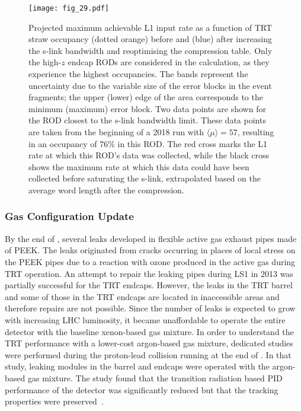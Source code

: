 \documentclass[cernpreprint, atlasdraft=false, UKenglish,british,orcidlogo, texmf, orcidlogo]{atlasdoc}
\begin{document}
 
\begin{figure}[htbp]
\centering
\texttt{[image: fig\_29.pdf]}
\caption{
Projected maximum achievable \gls{L1} input rate as a function of \gls{TRT} straw occupancy (dotted orange) before and (blue) after increasing the \gls{s-link} bandwidth and reoptimising the compression table.
Only the high-$z$ endcap \glspl{ROD} are considered in the calculation, as they experience the highest occupancies.
The bands represent the uncertainty due to the variable size of the error blocks in the event fragments; the upper (lower) edge of the area corresponds to the minimum (maximum) error block.
Two data points are shown for the \gls{ROD} closest to the \gls{s-link} bandwidth limit. These data points are taken from the beginning of a 2018 run with $\langle \mu \rangle = 57$, resulting in an occupancy of 76\% in this \gls{ROD}. The red cross marks the \gls{L1} rate at which this \gls{ROD}'s data was collected, while the black cross shows the maximum rate at which this data could have been collected before saturating the \gls{s-link}, extrapolated based on the average word length after the compression.
}
\label{fig:maxL1}
\end{figure}
 
\subsubsection{ Gas Configuration Update}
 
By the end of \RunOne, several leaks developed in flexible active gas exhaust pipes made of \gls{PEEK}. The leaks originated from cracks occurring in places of local stress on the \gls{PEEK} pipes due to a reaction with ozone produced in the active gas during \gls{TRT} operation. An attempt to repair the leaking pipes during \gls{LS1} in 2013 was partially successful for the \gls{TRT} endcaps. However, the leaks in the \gls{TRT} barrel and some of those in the \gls{TRT} endcaps are located in inaccessible areas and therefore repairs are not possible. Since the number of leaks is expected to grow with increasing \gls{LHC} luminosity, it became unaffordable to operate the entire detector with the baseline xenon-based gas mixture. In order to understand the \gls{TRT} performance with a lower-cost argon-based gas mixture, dedicated studies were performed during the proton-lead collision running at the end of \RunOne. In that study, leaking modules in the barrel and endcaps were operated with the argon-based gas mixture. The study found that the transition radiation based \gls{PID} performance of the detector was significantly reduced but that the tracking properties were preserved~\cite{IDET-2015-01}.
 
\end{document}
